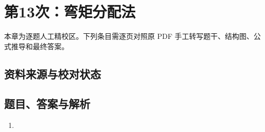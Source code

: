 \chapter{第13次：弯矩分配法}

本章为逐题人工精校区。下列条目需逐页对照原 PDF 手工转写题干、结构图、公式推导和最终答案。

\section{资料来源与校对状态}


\section{题目、答案与解析}

\begin{enumerate}[label=\textbf{第\arabic*题},wide]
  \item
  \begin{problemBox}
  \end{problemBox}

  \begin{solutionBox}
  \end{solutionBox}
\end{enumerate}

